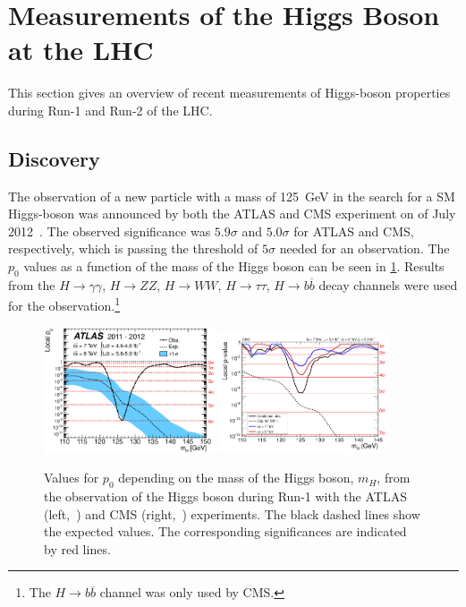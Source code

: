 \section{Measurements of the Higgs Boson at the LHC}\label{sec:theory:measurements}

This section gives an overview of recent measurements of Higgs-boson properties during Run-1 and Run-2 of the LHC\@.

\subsection{Discovery}\label{sub:theory:meas:discovery}

The observation of a new particle with a mass of \SI{125}{\GeV} in the search for a SM Higgs-boson was
announced by both the ATLAS and CMS experiment on  of July 2012~\cite{HiggsDiscoveryATLAS,HiggsDiscoveryCMS}.
The observed significance was $5.9\sigma$ and $5.0\sigma$ for ATLAS and CMS, respectively, which is passing the threshold of $5\sigma$
needed for an observation.
The $p_0$ values as a function of the mass of the Higgs boson can be seen in \cref{fig:theory:meas:disc:p0}.
Results from the $H\to\gamma\gamma$, $H\to ZZ$, $H \to WW$, $H\to\tau\tau$, $H\to b\overline{b}$ decay channels were used for the observation.\footnote{The $H\to b\overline{b}$ channel was only used by CMS.}

\begin{figure}[htb]
    \centering
    \includegraphics[width=0.45\textwidth]{./figures/theory/atlas_higgs_p0.eps}
    \includegraphics[width=0.45\textwidth]{./figures/theory/cms_higgs_p0.png}
    \caption{Values for $p_0$ depending on the mass of the Higgs boson, $m_H$, from the observation of the
             Higgs boson during Run-1 with the ATLAS (left,~\cite{HiggsDiscoveryATLAS}) and CMS (right,~\cite{HiggsDiscoveryCMS}) experiments.
             The black dashed lines show the expected values.
             The corresponding significances are indicated by red lines.}\label{fig:theory:meas:disc:p0}
\end{figure}

